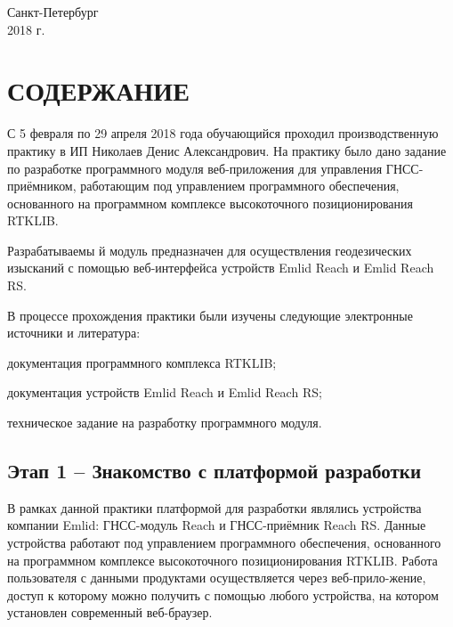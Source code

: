 \documentclass[pta]{../../../../scs-iam}
\begin{document}
\begin{center}
  {
    \normalsize
    Санкт-Петербург \\
    2018 г.
  }
\end{center}

\restoregeometry
\normalsize

\clearpage

\setcounter{page}{2}

\section*{СОДЕРЖАНИЕ}
\tableofcontents

\newpage


С 5 февраля по 29 апреля 2018 года обучающийся проходил производственную практику в ИП Николаев Денис Александрович. На практику было дано задание по разработке программного модуля веб-приложения для управления ГНСС-приёмником, работающим под управлением программного обеспечения, основанного на программном комплексе высокоточного позиционирования RTKLIB.

Разрабатываемы й модуль предназначен для осуществления геодезических изысканий с помощью веб-интерфейса устройств Emlid Reach и Emlid Reach RS.

В процессе прохождения практики были изучены следующие электронные источники и литература:
\begin{dashitemize}
  \item документация программного комплекса RTKLIB;
  \item документация устройств Emlid Reach и Emlid Reach RS;
  \item техническое задание на разработку программного модуля.
\end{dashitemize}


\subsection{Этап 1 -- Знакомство с платформой разработки}

В рамках данной практики платформой для разработки являлись устройства компании Emlid: ГНСС-модуль Reach и ГНСС-приёмник Reach RS. Данные устройства работают под управлением программного обеспечения, основанного на программном комплексе высокоточного позиционирования RTKLIB. Работа пользователя с данными продуктами осуществляется через веб-прило-жение, доступ к которому можно получить с помощью любого устройства, на котором установлен современный веб-браузер.
\end{document}
